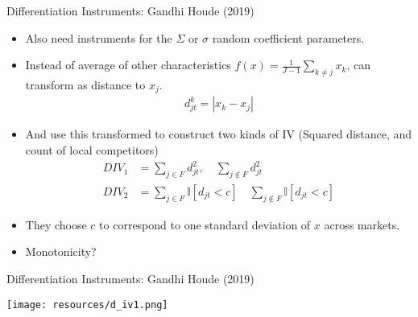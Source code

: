 \begin{frame}{Differentiation Instruments: Gandhi Houde (2019)}
\begin{itemize}
\item Also need instruments for the $\Sigma$ or $\sigma$ random coefficient parameters.
\item Instead of average of other characteristics $f(x) = \frac{1}{J-1} \sum_{k \neq j} x_k$, can transform as distance to $x_j$.
\begin{align*}
d_{jt} ^k=  |x_k - x_j |
\end{align*}
\item And use this transformed to construct two kinds of IV (Squared distance, and count of local competitors)
\begin{align*}
DIV_1 &= \sum_{j \in F}  d_{jt}^2,  \quad  \sum_{j \notin F}  d_{jt}^2 \\
DIV_2 &= \sum_{j \in F}  \mathbb{I}[d_{jt} < c]   \quad \sum_{j \notin F}   \mathbb{I}[d_{jt} < c]
\end{align*}
\item They choose $c$ to correspond to one standard deviation of $x$ across markets.
\item Monotonicity?
\end{itemize}
\end{frame}


\begin{frame}{Differentiation Instruments: Gandhi Houde (2019)}
\begin{center}
\texttt{[image: resources/d\_iv1.png]}
\end{center}
\end{frame}


